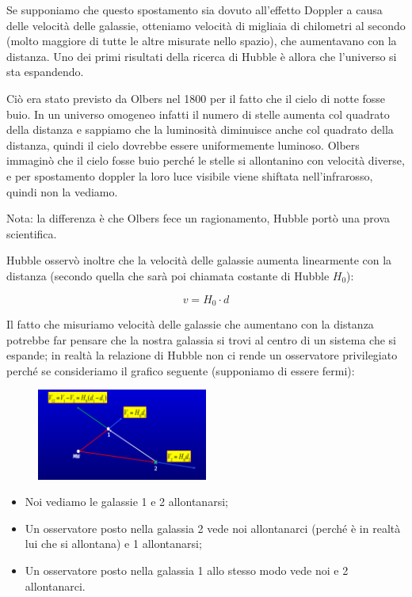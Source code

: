Se supponiamo che questo spostamento sia dovuto all'effetto Doppler a causa delle velocità delle galassie, otteniamo velocità di migliaia di chilometri al secondo (molto maggiore di tutte le altre misurate nello spazio), che aumentavano con la distanza. Uno dei primi risultati della ricerca di Hubble è allora che l'universo si sta espandendo.

Ciò era stato previsto da Olbers nel 1800 per il fatto che il cielo di notte fosse buio. In un universo omogeneo infatti il numero di stelle aumenta col quadrato della distanza e sappiamo che la luminosità diminuisce anche col quadrato della distanza, quindi il cielo dovrebbe essere uniformemente luminoso. Olbers immaginò che il cielo fosse buio perché le stelle si allontanino con velocità diverse, e per spostamento doppler la loro luce visibile viene shiftata nell'infrarosso, quindi non la vediamo.

Nota: la differenza è che Olbers fece un ragionamento, Hubble portò una prova scientifica.

Hubble osservò inoltre che la velocità delle galassie aumenta linearmente con la distanza (secondo quella che sarà poi chiamata costante di Hubble $H_0$):

$$v=H_0 \cdot d$$

Il fatto che misuriamo velocità delle galassie che aumentano con la distanza potrebbe far pensare che la nostra galassia si trovi al centro di un sistema che si espande; in realtà la relazione di Hubble non ci rende un osservatore privilegiato perché se consideriamo il grafico seguente (supponiamo di essere fermi):

\begin{figure}[H]
    \centering
    \includegraphics[width=0.5\textwidth]{immagini16dic/tuttilontani.png}
\end{figure}

\begin{itemize}
    \item Noi vediamo le galassie 1 e 2 allontanarsi;
    \item Un osservatore posto nella galassia 2 vede noi allontanarci (perché è in realtà lui che si allontana) e 1 allontanarsi;
    \item Un osservatore posto nella galassia 1 allo stesso modo vede noi e 2 allontanarci.
\end{itemize}

